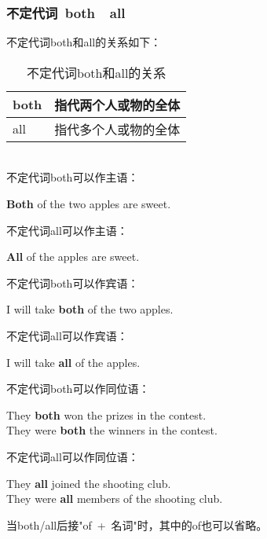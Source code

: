 \documentclass[UTF8]{ctexart}
\newcommand{\littf}[1]{{\hspace{3pt}\ttfamily #1}}
\begin{document}
\newpage

\subsubsection{不定代词~\littf{both}~~\littf{all}}
    不定代词\littf{both}和\littf{all}的关系如下：
    \begin{table}[h]
        \begin{center}
            \ttfamily
            \begin{tabular}{p{50pt}|p{130pt}}
                \hline
                both&指代两个人或物的全体\\ \hline
                all&指代多个人或物的全体\\ \hline
            \end{tabular}
            \rmfamily
            \caption{不定代词\littf{both}和\littf{all}的关系}
        \end{center}
    \end{table}\\
    不定代词\littf{both}可以作主语：
    \begin{center}
        \large\ttfamily
        \textbf{Both} of the two apples are sweet.\\[6mm]
    \end{center}
    不定代词\littf{all}可以作主语：
    \begin{center}
        \large\ttfamily
        \textbf{All} of the apples are sweet.\\[6mm]
    \end{center}
    不定代词\littf{both}可以作宾语：
    \begin{center}
        \large\ttfamily
        I will take \textbf{both} of the two apples.\\[6mm]
    \end{center}
    不定代词\littf{all}可以作宾语：
    \begin{center}
        \large\ttfamily
        I will take \textbf{all} of the apples.\\[6mm]
    \end{center}
    不定代词\littf{both}可以作同位语：
    \begin{center}
        \large\ttfamily
        They \textbf{both} won the prizes in the contest.\\[3mm]
        They were \textbf{both} the winners in the contest.\\[6mm]
    \end{center}
    不定代词\littf{all}可以作同位语：
    \begin{center}
        \large\ttfamily
        They \textbf{all} joined the shooting club.\\[3mm]
        They were \textbf{all} members of the shooting club.\\[6mm]
    \end{center}
    当\littf{both/all}后接\littf{"of~+~名词"}时，其中的\littf{of}也可以省略。
\end{document}
